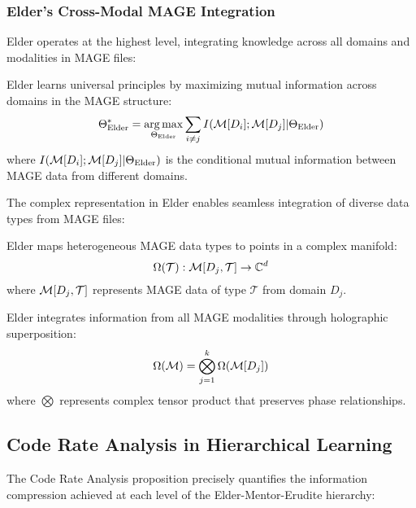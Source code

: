 \subsubsection{Elder's Cross-Modal MAGE Integration}

Elder operates at the highest level, integrating knowledge across all domains and modalities in MAGE files:

\begin{theorem}
Elder learns universal principles by maximizing mutual information across domains in the MAGE structure:
\begin{equation}
\Theta_{\text{Elder}}^* = \mathop{\mathrm{arg\,max}}_{\Theta_{\text{Elder}}} \sum_{i \neq j} I(\mathcal{M}[D_i]; \mathcal{M}[D_j] | \Theta_{\text{Elder}})
\end{equation}
where $I(\mathcal{M}[D_i]; \mathcal{M}[D_j] | \Theta_{\text{Elder}})$ is the conditional mutual information between MAGE data from different domains.
\end{theorem}

The complex representation in Elder enables seamless integration of diverse data types from MAGE files:

\begin{proposition}
Elder maps heterogeneous MAGE data types to points in a complex manifold:
\begin{equation}
\Omega(\mathcal{T}): \mathcal{M}[D_j, \mathcal{T}] \rightarrow \mathbb{C}^{d}
\end{equation}
where $\mathcal{M}[D_j, \mathcal{T}]$ represents MAGE data of type $\mathcal{T}$ from domain $D_j$.
\end{proposition}

\begin{theorem}
Elder integrates information from all MAGE modalities through holographic superposition:
\begin{equation}
\Omega(\mathcal{M}) = \bigotimes_{j=1}^k \Omega(\mathcal{M}[D_j])
\end{equation}
where $\bigotimes$ represents complex tensor product that preserves phase relationships.
\end{theorem}

\subsection{Code Rate Analysis in Hierarchical Learning}

The Code Rate Analysis proposition precisely quantifies the information compression achieved at each level of the Elder-Mentor-Erudite hierarchy:

